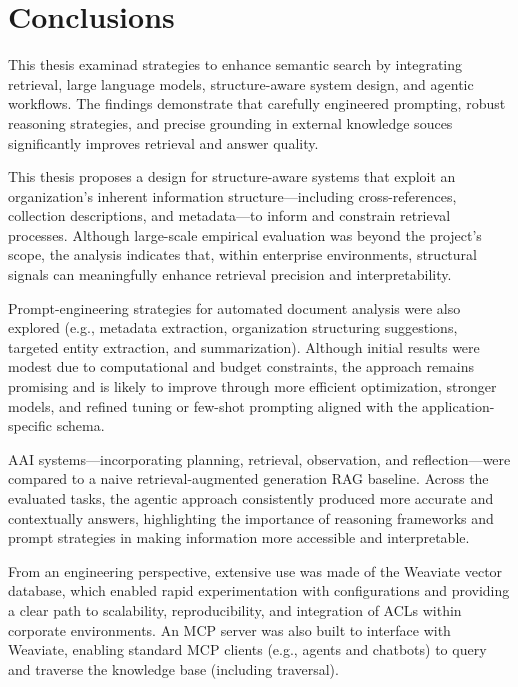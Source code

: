 \cleardoublepage%
\label{chap:conclusion}%


\section{Conclusions}

This thesis examinad strategies to enhance semantic search by integrating retrieval, large language models, structure-aware system design, and agentic workflows. The findings demonstrate that carefully engineered prompting, robust reasoning strategies, and precise grounding in external knowledge souces significantly improves retrieval and answer quality.

This thesis proposes a design for structure-aware systems that exploit an organization's inherent information structure—including cross-references, collection descriptions, and metadata—to inform and constrain retrieval processes. Although large-scale empirical evaluation was beyond the project's scope, the analysis indicates that, within enterprise environments, structural signals can meaningfully enhance retrieval precision and interpretability.

Prompt-engineering strategies for automated document analysis were also explored (e.g., metadata extraction, organization structuring suggestions, targeted entity extraction, and summarization). Although initial results were modest due to computational and budget constraints, the approach remains promising and is likely to improve through more efficient optimization, stronger models, and refined tuning or few-shot prompting aligned with the application-specific schema.

\gls{AAI} systems—incorporating planning, retrieval, observation, and reflection—were compared to a naive retrieval-augmented generation \gls{RAG} baseline. Across the evaluated tasks, the agentic approach consistently produced more accurate and contextually answers, highlighting the importance of reasoning frameworks and prompt strategies in making information more accessible and interpretable.

From an engineering perspective, extensive use was made of the Weaviate vector database, which enabled rapid experimentation with configurations and providing a clear path to scalability, reproducibility, and integration of \glspl{ACL} within corporate environments. An \gls{MCP} server was also built to interface with Weaviate, enabling standard \gls{MCP} clients (e.g., agents and chatbots) to query and traverse the knowledge base (including traversal).

